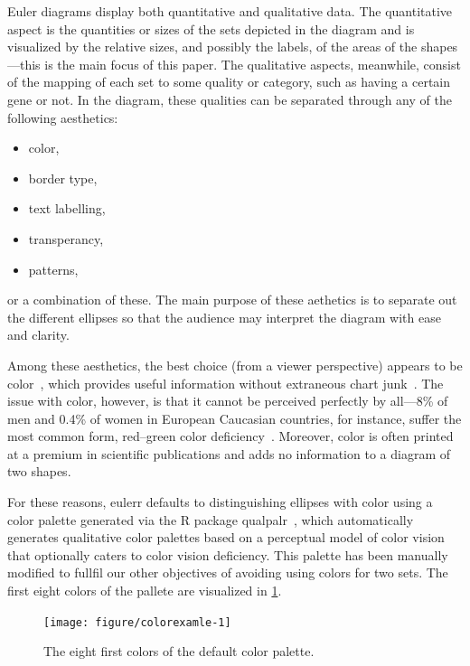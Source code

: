 \documentclass[
  oneside,
  openany,
  numbers=noendperiod,
  parskip=half,
  bibliography=totoc
]{scrbook}\usepackage[]{graphicx}\usepackage{xcolor}
\newenvironment{knitrout}{}{} %
\newcommand{\pkg}[1]{{\fontseries{b}\selectfont #1}}
\begin{document}
Euler diagrams display both quantitative and qualitative data. The quantitative
aspect is the quantities or sizes of the sets depicted in the diagram and is
visualized by the relative sizes, and possibly the labels, of the areas of the
shapes---this is the main focus of this paper. The qualitative aspects,
meanwhile, consist of the mapping of each set to some quality or category, such
as having a certain gene or not. In the diagram, these qualities can be
separated through any of the following aesthetics:
%
\begin{itemize}
\item color,
\item border type,
\item text labelling,
\item transperancy,
\item patterns,
\end{itemize}
%
or a combination of these. The main purpose of these aethetics is to separate
out the different ellipses so that the audience may interpret the diagram with
ease and clarity.

Among these aesthetics, the best choice (from a viewer perspective) appears to
be color~\citep{Blake_2016}, which provides useful information without
extraneous chart junk~\citep{Tufte_2001}. The issue with color, however, is that
it cannot be perceived perfectly by all---8\% of men and 0.4\% of women in
European Caucasian countries, for instance, suffer the most common form,
red--green color deficiency~\cite{Birch_2012}. Moreover, color
is often printed at a premium in scientific publications and adds no information
to a diagram of two shapes.

For these reasons, \pkg{eulerr} defaults to distinguishing ellipses with color
using a color palette generated via the R package
\pkg{qualpalr}~\citep{Larsson_2016}, which automatically generates qualitative
color palettes based on a perceptual model of color vision that optionally
caters to color vision deficiency. This palette has been manually modified
to fullfil our other objectives of avoiding using colors for two
sets. The first eight colors of the pallete are visualized in
\cref{fig:colorexample}.

\begin{figure}[htbp]
\caption{The eight first colors of the default color palette.\label{fig:colorexample}}
\begin{knitrout}\small
{}\color{fgcolor}

{\centering \texttt{[image: figure/colorexamle-1]} 

}



\end{knitrout}
\end{figure}
\end{document}
